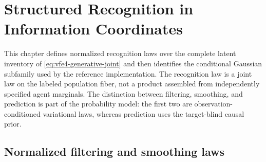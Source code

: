 \chapter{Structured Recognition in Information Coordinates}

This chapter defines normalized recognition laws over the complete latent inventory of \cref{eq:vfe4-generative-joint} and then identifies the conditional Gaussian subfamily used by the reference implementation. The recognition law is a joint law on the labeled population fiber, not a product assembled from independently specified agent marginals. The distinction between filtering, smoothing, and prediction is part of the probability model: the first two are observation-conditioned variational laws, whereas prediction uses the target-blind causal prior.

\section{Normalized filtering and smoothing laws}

